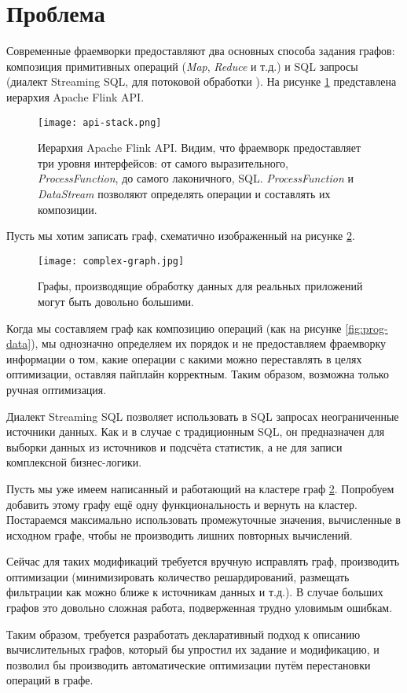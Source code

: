 \section{Проблема}

Современные фраемворки предоставляют два основных способа задания графов: композиция примитивных операций (\textit{Map}, \textit{Reduce} и т.д.) и SQL запросы (диалект Streaming SQL, для потоковой обработки \cite{streaming-sql}). На рисунке \ref{fig:api-stack} представлена иерархия  Apache Flink API.

\begin{figure}[h]
    \texttt{[image: api-stack.png]}
    \caption{Иерархия Apache Flink API. Видим, что фраемворк предоставляет три уровня интерфейсов: от самого выразительного, \textit{ProcessFunction}, до самого лаконичного, SQL. \textit{ProcessFunction} и \textit{DataStream} позволяют определять операции и составлять их композиции.}
    \label{fig:api-stack}
\end{figure}

Пусть мы хотим записать граф, схематично изображенный на рисунке \ref{fig:complex-graph}.

\begin{figure}[h]
    \centering
    \texttt{[image: complex-graph.jpg]}
    \caption{Графы, производящие обработку данных для реальных приложений могут быть довольно большими.}
    \label{fig:complex-graph}
\end{figure}

Когда мы составляем граф как композицию операций (как на рисунке \ref{fig:prog-data}),
мы однозначно определяем их порядок и не предоставляем фраемворку информации о том,
какие операции с какими можно переставлять в целях оптимизации, оставляя пайплайн корректным.
Таким образом, возможна только ручная оптимизация.

Диалект Streaming SQL позволяет использовать в SQL запросах неограниченные источники данных.
Как и в случае с традиционным SQL, он предназначен для выборки данных из источников и подсчёта статистик, а не для записи комплексной бизнес-логики.

Пусть мы уже имеем написанный и работающий на кластере граф \ref{fig:complex-graph}.
Попробуем добавить этому графу ещё одну функциональность и вернуть на кластер.
Постараемся максимально использовать промежуточные значения, вычисленные в исходном графе, чтобы не производить лишних повторных вычислений.

Сейчас для таких модификаций требуется вручную исправлять граф, производить оптимизации (минимизировать количество решардирований, размещать фильтрации как можно ближе к источникам данных и т.д.). В случае больших графов это довольно сложная работа, подверженная трудно уловимым ошибкам.

Таким образом, требуется разработать декларативный подход к описанию вычислительных графов, который бы упростил их задание и модификацию, и позволил бы производить автоматические оптимизации путём перестановки операций в графе.
